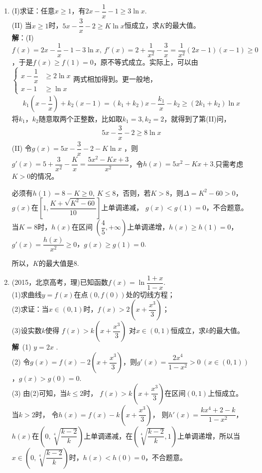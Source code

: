 \begin{enumerate}[label={\textbf{\arabic*.}},leftmargin=
    \inteval{\myenumleftmargin}pt]
\item (I)求证：任意$ x\geq 1 $，有$ 2x-\dfrac{1}{x}-1\geq 3\ln x $.\\
(II) 当$ x\geq 1 $时，$ 5x-\dfrac{3}{x}-2\geq K\ln x $恒成立，求$ K $的最大值。
\ifteach \\ \textbf{解}：(I)
$ f(x)=2x-\dfrac{1}{x}-1-3\ln x,\ f'(x)=2+\dfrac{1}{x^2}-\dfrac{3}{x}=\dfrac{1}{x^2}
(2x-1)(x-1)\geq 0 $，于是$ f(x)\geq f(1)=0 $，原不等式成立。实际上，可以由$ \left\{\begin{aligned}
    x-\dfrac{1}{x} & \geq 2\ln x\\
    x-1 & \geq \ln x
\end{aligned}\right. $两式相加得到。更一般地，
\begin{gather*}
    k_1\left(x-\dfrac{1}{x}\right)+k_2(x-1)=(k_1+k_2)x-\dfrac{k_1}{x}-k_2
    \geq (2k_1+k_2)\ln x 
\end{gather*}
将$k_1，k_2 $随意取两个正整数，比如取$ k_1=3,k_2=2 $，就得到了第(II)问，
\begin{gather*}
    5x-\dfrac{3}{x}-2\geq 8\ln x
\end{gather*}
(II) 令$ g(x)=5x-\dfrac{3}{x}-2-K\ln x$ ，则$ g'(x)=5+\dfrac{3}{x^2}-\dfrac{K}{x}=\dfrac{5x^2-Kx+3}{x^2} $，令$ h(x)=5x^2-Kx+3 $.只需考虑$ K>0 $的情况。 

必须有$ h(1)=8-K\geq 0,\ K\leq 8 $，否则，若$ K>8 $，则$ \Delta=K^2-60>0 $，
$ g(x) $在$ \left[1,\dfrac{K+\sqrt{K^2-60}}{10}\right] $上单调递减，
$ g(x)<g(1)=0 $，不合题意。当$ K=8 $时，$ h(x) $在区间
$ \left(\dfrac{4}{5},+\infty\right) $上单调递增，$ h(x)\geq h(1)=0 $，
$ g'(x)=\dfrac{h(x)}{x^2}\geq 0 $，$ g(x)\geq g(1)=0 $.

所以，$ K $的最大值是8.

\item (2015，北京高考，理)已知函数$ f(x)=\ln\dfrac{1+x}{1-x} $.\\
(1)求曲线$ y=f(x) $在点$ (0,f(0)) $处的切线方程；\\
(2)求证：当$ x\in(0,1) $时，$ f(x)>2\left(x+\dfrac{x^{3}}{3}\right) $；\\
(3)设实数$ k $使得 $ f(x)>k\left(x+\dfrac{x^{3}}{3}\right) $
对$ x\in(0,1) $恒成立，求$ k $的最大值。\\
\textbf{解}\ (1) $ y=2x $ .\\
(2) 令$ g(x)=f(x)-2\left(x+\dfrac{x^{3}}{3}\right) $，则$ g'(x)=
\dfrac{2x^4}{1-x^2}>0\ (x\in(0,1)) $，$ g(x)>g(0)=0 $. \\
(3)  由(2)可知，当$ k\leq 2 $时， $ f(x)>k\left(x+
\dfrac{x^{3}}{3}\right) $在区间$ (0,1) $上恒成立。
当$ k>2 $时， 令$ h(x)=f(x)-k\left(x+\dfrac{x^{3}}{3}\right) $，
则$ h'(x)=\dfrac{k x^{4}+2-k}{1-x^{2}} $，
$ h(x) $在$ \left(0,\sqrt[4]{\dfrac{k-2}{k}}
\right) $上单调递减，在$ \left(\sqrt[4]{\dfrac{k-2}{k}},
1\right) $上单调递增，所以当 $ x\in\left(0,\sqrt[4]{\dfrac{k-2}{k}}
\right) $时，$ h(x)<h(0)=0 $，不合题意。


\end{enumerate}
